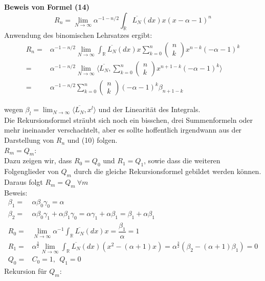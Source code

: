 \documentclass[a4paper, 11pt]{scrreprt}
\newcommand{\RR}{\mathbb{R}}
\begin{document}
\textbf{Beweis von Formel (14)}\\
\begin{equation}
R_n=\lim_{N \to \infty} \alpha^{-1-n/2} \int_{\RR}\overline{L_{N}}(dx)x(x-\alpha-1)^{n} 
\end{equation}
Anwendung des binomischen Lehrsatzes ergibt:
\begin{align*}
 R_n =& \alpha^{-1-n/2} \lim_{N \to \infty} \int_{\RR}\overline{L_{N}}(dx)x \sum_{k=0}^n \begin{pmatrix} n\\k\end{pmatrix} x^{n-k}(-\alpha -1)^k \\
 =& \alpha^{-1-n/2} \lim_{N \to \infty} \langle \overline{L_{N}}, \sum_{k=0}^n \begin{pmatrix} n\\k\end{pmatrix} x^{n+1-k}(-\alpha -1)^k \rangle \\
 =& \alpha^{-1-n/2}\sum_{k=0}^n \begin{pmatrix} n\\k\end{pmatrix} (-\alpha -1)^k \beta_{n+1-k}
\end{align*}

wegen $\beta_l = \lim_{N\to\infty} \langle \overline{L_N}, x^l \rangle$ und der Linearität des Integrals.\\
Die Rekursionsformel sträubt sich noch ein bisschen, drei Summenformeln oder mehr ineinander verschachtelt, aber es sollte hoffentlich irgendwann aus der Darstellung von $ R_n $ und (10) folgen. \\


{$ R_m=Q_m $:}\\
Dazu zeigen wir, dass $ R_0=Q_0 $ und $ R_1=Q_1 $, sowie dass die weiteren Folgenglieder von $ Q_m $ durch die gleiche Rekursionsformel gebildet werden können. Daraus folgt $ R_m=Q_m ~ \forall m$ \\

Beweis: \begin{align*}
\beta_1=& \alpha \beta_0 \gamma_0 = \alpha \\
\beta_2=& \alpha \beta_0 \gamma_1 + \alpha \beta_1 \gamma_0 = \alpha \gamma_1 + \alpha \beta_1 = \beta_1 + \alpha \beta_1  \\
R_0 =& \lim_{N \to \infty} \alpha^{-1} \int_{\RR}\overline{L_{N}}(dx)x = \dfrac{\beta_1}{\alpha}=1 \\
R_1 =& \alpha^{\frac{3}{2}} \lim_{N \to \infty}\int_{\RR}\overline{L_{N}}(dx)(x^2 - (\alpha +1)x)= \alpha^{\frac{3}{2}} (\beta_2 - (\alpha+1)\beta_1)=0 \\
Q_0=& C_0 =1, ~~Q_1=0
\end{align*}
Rekursion für $ Q_m: $
\end{document}
